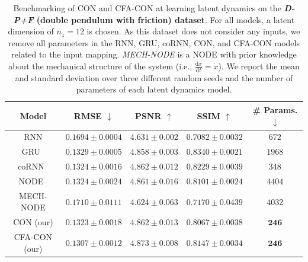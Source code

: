 \begin{table}[ht]
    \centering
    \begin{scriptsize}
    \begin{tabular}{c c c c c}
         \toprule
         \textbf{Model} & \textbf{RMSE} $\downarrow$ & \textbf{PSNR} $\uparrow$ & \textbf{SSIM} $\uparrow$ & \textbf{\# Params.} $\downarrow$ \\
         \midrule
         RNN & $0.1694 \pm 0.0004$ & $4.631 \pm 0.002$ & $0.7082 \pm 0.0032$ & $672$\\
         GRU~\citep{cho2014learning} & $0.1329 \pm 0.0005$ & $4.858 \pm 0.003$ & $\mathbf{0.8340 \pm 0.0021}$ & $1968$\\
         coRNN~\citep{rusch2020coupled} & $0.1324 \pm 0.0016$ & $4.862 \pm 0.012$ & $0.8229 \pm 0.0039$ & $348$\\
         NODE~\citep{chen2018neural} & $0.1324 \pm 0.0024$ & $4.861 \pm 0.016$ & $0.8101 \pm 0.0024$ & $4404$\\
         MECH-NODE & $0.1710 \pm 0.0111$ & $4.624 \pm 0.063$ & $0.7170 \pm 0.0439$ & $4032$\\
         CON (our) & $0.1323 \pm 0.0018$ & $4.862 \pm 0.013$ & $0.8067 \pm 0.0038$ & $\mathbf{246}$\\
         CFA-CON (our) & $\mathbf{0.1307 \pm 0.0012}$ & $\mathbf{4.873 \pm 0.008}$ & $0.8147 \pm 0.0034$ & $\mathbf{246}$\\
         \bottomrule
    \end{tabular}
    \end{scriptsize}
    \vspace{0.5cm}
    \caption{Benchmarking of \gls{CON} and \gls{CFA-CON} at learning latent dynamics on the \textbf{\emph{D-P+F} (double pendulum with friction) dataset}. For all models, a latent dimension of $n_z=12$ is chosen. 
    As this dataset does not consider any inputs, we remove all parameters in the RNN, GRU, coRNN, CON, and CFA-CON models related to the input mapping.
    \emph{MECH-NODE} is a \gls{NODE} with prior knowledge about the mechanical structure of the system (i.e., $\frac{\mathrm{d}x}{\mathrm{d}t} = \dot{x}$). We report the mean and standard deviation over three different random seeds and the number of parameters of each latent dynamics model.
    }
    \label{tab:apx-con:latent_dynamics_results:d_p_f}
\end{table}

